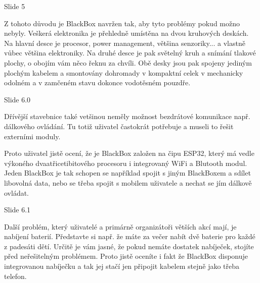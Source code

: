 
Slide 5

Z tohoto důvodu je BlackBox navržen tak, aby tyto problémy pokud možno nebyly. 
Veškerá elektronika je přehledně umístěna na dvou kruhových deskách.
Na hlavní desce je procesor, power management, většina
senzoriky... a vlastně vůbec většina elektroniky. Na druhé desce je pak světelný kruh a snímání tlakové plochy, 
o obojím vám něco řeknu za chvíli.
Obě desky jsou pak spojeny jediným plochým kabelem a smontovány dohromady v kompaktní celek 
v mechanicky odolném a v zamčeném stavu dokonce vodotěsném pouzdře. %


Slide 6.0

Dřívější stavebnice také vetšinou neměly možnost bezdrátové komunikace např. dálkového ovládání.
Tu totiž uživatel častokrát potřebuje a museli to řešit externími moduly.

Proto uživatel jistě ocení, že je BlackBox založen na čipu ESP32, 
který má vedle výkoného dvaatřicetibitového procesoru i integrovaný WiFi a Blutooth modul. 
Jeden BlackBox je tak schopen se například spojit s jiným BlackBoxem a sdílet libovolná data, 
nebo se třeba spojit s mobilem uživatele a nechat se jím dálkově ovládat. %

Slide 6.1

Další problém, který uživatelé a primárně organizátoři větších akcí mají, je nabíjení baterií. 
Představte si např. že máte za večer nabít dvě baterie pro každé z padesáti dětí. Určitě je vám jasné, že pokud 
nemáte dostatek nabíječek, stojíte před neřešitelným problémem.
Proto jistě oceníte i fakt že BlackBox disponuje integrovanou nabíječku a tak jej stačí 
jen připojit kabelem stejně jako třeba telefon.


